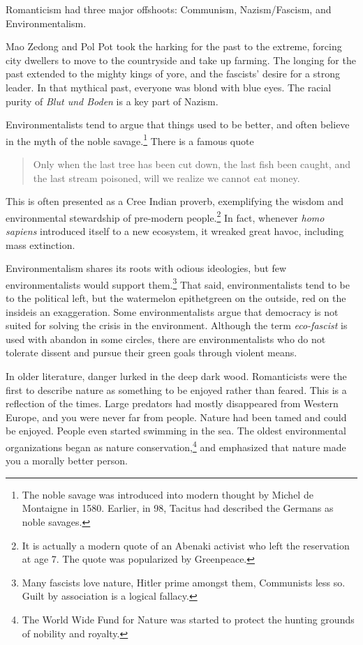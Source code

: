 Romanticism had three major offshoots: Communism, Nazism/Fascism, and Environmentalism.

Mao Zedong and Pol Pot took the harking for the past to the extreme, forcing city dwellers to move to the countryside and take up farming. The longing for the past extended to the mighty kings of yore, and the fascists' desire for a strong leader. In that mythical past, everyone was blond with blue eyes. The racial purity of \emph{Blut und Boden} is a key part of Nazism.

Environmentalists tend to argue that things used to be better, and often believe in the myth of the noble savage.\footnote{The noble savage was introduced into modern thought by Michel de Montaigne in 1580. Earlier, in 98, Tacitus had described the Germans as noble savages.} There is a famous quote
\begin{quote}
    Only when the last tree has been cut down, the last fish been caught, and the last stream poisoned, will we realize we cannot eat money.
\end{quote}
This is often presented as a Cree Indian proverb, exemplifying the wisdom and environmental stewardship of pre-modern people.\footnote{It is actually a modern quote of an Abenaki activist who left the reservation at age 7. The quote was popularized by Greenpeace.} In fact, whenever \textit{homo sapiens} introduced itself to a new ecosystem, it wreaked great havoc, including mass extinction.

Environmentalism shares its roots with odious ideologies, but few environmentalists would support them.\footnote{Many fascists love nature, Hitler prime amongst them, Communists less so. Guilt by association is a logical fallacy.} That said, environmentalists tend to be to the political left, but the watermelon epithet\textemdash green on the outside, red on the inside\textemdash is an exaggeration. Some environmentalists argue that democracy is not suited for solving the crisis in the environment. Although the term \emph{eco-fascist} is used with abandon in some circles, there are environmentalists who do not tolerate dissent and pursue their green goals through violent means.

In older literature, danger lurked in the deep dark wood. Romanticists were the first to describe nature as something to be enjoyed rather than feared. This is a reflection of the times. Large predators had mostly disappeared from Western Europe, and you were never far from people. Nature had been tamed and could be enjoyed. People even started swimming in the sea. The oldest environmental organizations began as nature conservation,\footnote{The World Wide Fund for Nature was started to protect the hunting grounds of nobility and royalty.} and emphasized that nature made you a morally better person.

